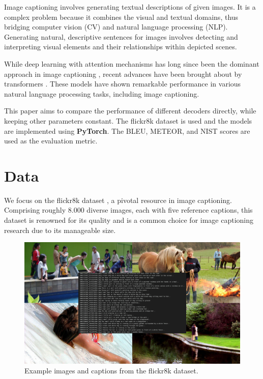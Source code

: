 \documentclass[12pt]{article}
\theoremstyle{plain}
\theoremstyle{definition}
\theoremstyle{remark}
\begin{document}
Image captioning involves generating textual descriptions of given images. It is a complex problem because it combines the visual and textual domains, thus bridging computer vision (CV) and natural language processing (NLP). Generating natural, descriptive sentences for images involves detecting and interpreting visual elements and their relationships within depicted scenes.
\par While deep learning with attention mechanisms has long since been the dominant approach in image captioning \cite{xu2015show}, recent advances have been brought about by transformers \cite{vaswani2017attention}. These models have shown remarkable performance in various natural language processing tasks, including image captioning.
\par This paper aims to compare the performance of different decoders directly, while keeping other parameters constant. The flickr8k dataset is used and the models are implemented using \textbf{PyTorch}. The BLEU, METEOR, and NIST scores are used as the evaluation metric.



\section{Data}\label{sec:data}
We focus on the flickr8k dataset \cite{hodosh2013flickr8k}, a pivotal resource in image captioning. Comprising roughly 8.000 diverse images, each with five reference captions, this dataset is renowned for its quality and is a common choice for image captioning research due to its manageable size.

\begin{figure}[H]
    \centering
    \includegraphics[width=.9\textwidth]{res/flickr8k.png}
    \caption{Example images and captions from the flickr8k dataset.}
    \label{fig:flickr8k}
\end{figure}
\end{document}
